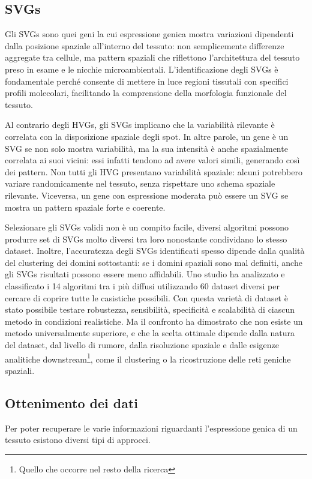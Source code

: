\subsection{SVGs}\label{sec:SVGs}
Gli SVGs sono quei geni la cui espressione genica mostra variazioni 
dipendenti dalla posizione spaziale all'interno del tessuto: 
non semplicemente differenze aggregate tra cellule, ma pattern spaziali che riflettono 
l'architettura del tessuto preso in esame e le nicchie microambientali. 
L'identificazione degli SVGs è fondamentale perché consente di mettere in 
luce regioni tissutali con specifici profili molecolari, 
facilitando la comprensione della morfologia funzionale del tessuto.

Al contrario degli HVGs, gli SVGs implicano che la variabilità rilevante è correlata 
con la disposizione spaziale degli spot. 
In altre parole, un gene è un SVG se non solo mostra variabilità, ma la sua intensità è anche 
spazialmente correlata ai suoi vicini: essi infatti tendono ad avere valori simili, 
generando così dei pattern.
Non tutti gli HVG presentano variabilità spaziale: alcuni potrebbero variare randomicamente nel tessuto, 
senza rispettare uno schema spaziale rilevante. 
Viceversa, un gene con espressione moderata può essere un SVG se mostra 
un pattern spaziale forte e coerente\cite{SVGS1}.

Selezionare gli SVGs validi non è un compito facile, diversi algoritmi possono 
produrre set di SVGs molto diversi tra loro nonostante condividano lo stesso dataset.
Inoltre, l'accuratezza degli SVGs identificati spesso dipende dalla qualità del 
clustering dei domini sottostanti: se i domini spaziali sono mal definiti, 
anche gli SVGs risultati possono essere meno affidabili.
Uno studio ha analizzato e classificato i 14 algoritmi tra i più diffusi utilizzando 60 dataset diversi per cercare di coprire 
tutte le casistiche possibili. Con questa varietà di dataset è stato possibile testare robustezza, sensibilità, specificità e 
scalabilità di ciascun metodo in condizioni realistiche.
Ma il confronto ha dimostrato che non esiste un metodo universalmente superiore, 
e che la scelta ottimale dipende dalla natura del dataset, 
dal livello di rumore, dalla risoluzione spaziale e dalle esigenze analitiche 
downstream\footnote{Quello che occorre nel resto della ricerca}, 
come il clustering o la ricostruzione delle reti geniche spaziali\cite{SVGS2}.

\subsection{Ottenimento dei dati}\label{sec:OttenimentoDatiTS}
Per poter recuperare le varie informazioni riguardanti l'espressione genica di un tessuto esistono diversi tipi di approcci\cite{CasiUsoTS2}.
